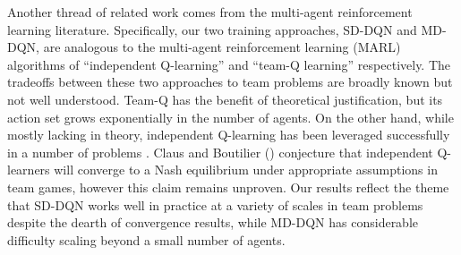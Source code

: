 Another thread of related work comes from the multi-agent reinforcement learning literature. Specifically, our two training approaches, SD-DQN and MD-DQN, are analogous to the multi-agent reinforcement learning (MARL) algorithms of ``independent Q-learning'' \cite{claus1998dynamics} and ``team-Q learning'' \cite{littman2001value} respectively. The tradeoffs between these two approaches to team problems are broadly known but not well understood. Team-Q  has the benefit of theoretical justification, but its action set grows exponentially in the number of agents. On the other hand, while mostly lacking in theory, independent Q-learning has been leveraged successfully in a number of problems \cite{crites1998elevator,oda2018movi}. Claus and Boutilier (\cite{claus1998dynamics}) conjecture that
independent Q-learners will converge to a Nash equilibrium under appropriate assumptions in team games, however this claim remains unproven. Our results reflect the theme that SD-DQN works well in practice at a variety of scales in team problems despite the dearth of convergence results, while MD-DQN has considerable difficulty scaling beyond a small number of agents.